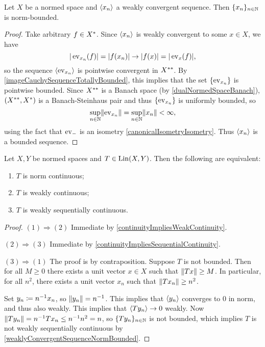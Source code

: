 \begin{proposition} \label{weaklyConvergentSequenceNormBounded}
Let $X$ be a normed space and $\left\langle x_n \right\rangle$ a weakly convergent sequence. Then $\{x_n\}_{n\in \mathbb{N}}$ is norm-bounded.
\end{proposition}
\begin{proof}
Take arbitrary $f\in {X}^*$. Since $\left\langle x_n \right\rangle$ is weakly convergent to some $x\in X$, we have
\[ |\operatorname{ev}_{x_n}(f)| = |f(x_n)| \to |f(x)| = |\operatorname{ev}_x(f)|, \]
so the sequence $\left\langle \operatorname{ev}_{x_n} \right\rangle$ is pointwise convergent in ${X}^{**}$. By \ref{imageCauchySequenceTotallyBounded}, this implies that the set $\{\operatorname{ev}_{x_n}\}$ is pointwise bounded. Since ${X}^{**}$ is a Banach space (by \ref{dualNormedSpaceBanach}), $({X}^{**}, {X}^*)$ is a Banach-Steinhaus pair and thus $\{\operatorname{ev}_{x_n}\}$ is uniformly bounded, so
\[ \sup_{n\in \mathbb{N}}\lVert\operatorname{ev}_{x_n}\rVert = \sup_{n\in \mathbb{N}}\lVert x_n\rVert < \infty, \]
using the fact that $\operatorname{ev}_-$ is an isometry \ref{canonicalIsometryIsometry}. Thus $\left\langle x_n \right\rangle$ is a bounded sequence.
\end{proof}

\begin{proposition}
Let $X,Y$ be normed spaces and $T\in \operatorname{Lin}(X,Y)$. Then the following are equivalent:
\begin{enumerate}
\item $T$ is norm continuous;
\item $T$ is weakly continuous;
\item $T$ is weakly sequentially continuous.
\end{enumerate}
\end{proposition}
\begin{proof}
$(1) \Rightarrow (2)$ Immediate by \ref{continuityImpliesWeakContinuity}.

$(2) \Rightarrow (3)$ Immediate by \ref{continuityImpliesSequentialContinuity}.

$(3) \Rightarrow (1)$ The proof is by contraposition. Suppose $T$ is not bounded. Then for all $M\geq 0$ there exists a unit vector $x\in X$ such that $\lVert Tx\rVert \geq M$. In particular, for all $n^2$, there exists a unit vector $x_n$ such that $\lVert Tx_n\rVert \geq n^2$.

Set $y_n \coloneqq n^{-1}x_n$, so $\lVert y_n\rVert = n^{-1}$. This implies that $\left\langle y_n \right\rangle$ converges to $0$ in norm, and thus also weakly. This implies that $\left\langle Ty_n \right\rangle \to 0$ weakly. Now $\lVert Ty_n\rVert = n^{-1}Tx_n \leq n^{-1}n^2 = n$, so $\{Ty_n\}_{n\in\mathbb{N}}$ is not bounded, which implies $T$ is not weakly sequentially continuous by \ref{weaklyConvergentSequenceNormBounded}.
\end{proof}

